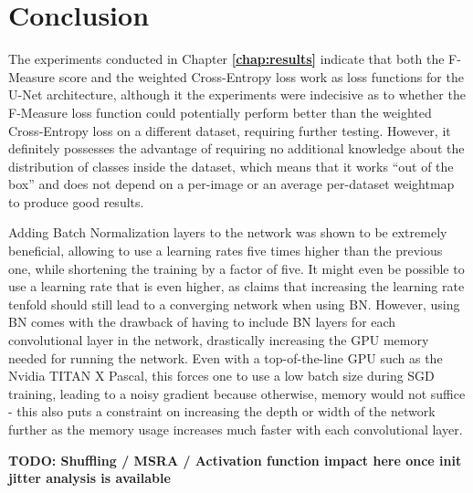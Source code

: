\chapter {Conclusion}
\label{chap:conclusion}

The experiments conducted in Chapter \textbf{\ref{chap:results}} indicate that both the F-Measure score and the weighted Cross-Entropy loss work as loss functions for the U-Net architecture, although it the experiments were indecisive as to whether the F-Measure loss function could potentially perform better than the weighted Cross-Entropy loss on a different dataset, requiring further testing. However, it definitely possesses the advantage of requiring no additional knowledge about the distribution of classes inside the dataset, which means that it works ``out of the box'' and does not depend on a per-image or an average per-dataset weightmap to produce good results.

Adding Batch Normalization layers to the network was shown to be extremely beneficial, allowing to use a learning rates five times higher than the previous one, while shortening the training by a factor of five. It might even be possible to use a learning rate that is even higher, as \cite{batchnorm} claims that increasing the learning rate tenfold should still lead to a converging network when using BN. However, using BN comes with the drawback of having to include BN layers for each convolutional layer in the network, drastically increasing the GPU memory needed for running the network. Even with a top-of-the-line GPU such as the Nvidia TITAN X Pascal, this forces one to use a low batch size during SGD training, leading to a noisy gradient because otherwise, memory would not suffice - this also puts a constraint on increasing the depth or width of the network further as the memory usage increases much faster with each convolutional layer.

\textbf{TODO: Shuffling / MSRA / Activation function impact here once init jitter analysis is available}

